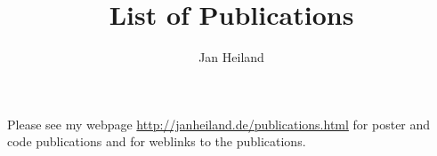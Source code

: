 \documentclass[a4paper,10pt]{scrartcl}
\title{List of Publications}
\author{Jan Heiland}
\begin{document}
\maketitle
{}
{}
\newpage
{}
{}

{}

{}
\vfill
Please see my webpage \url{http://janheiland.de/publications.html} for poster and code publications and for weblinks to the publications.
\end{document}
